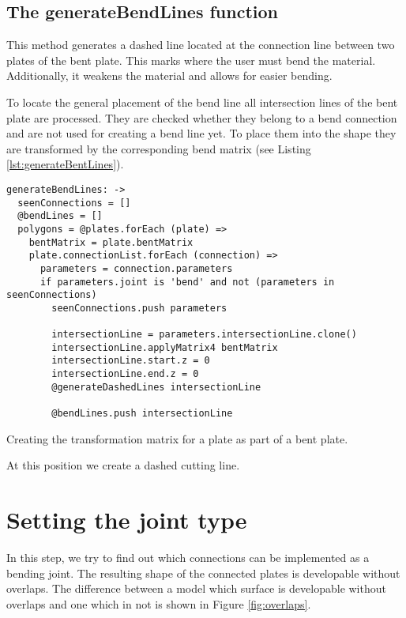 \documentclass[../ClassicThesis.tex]{subfiles}
\begin{document}
\subsection{The generateBendLines function}
\label{sec:generateBendLines}

This method generates a dashed line located at the connection line between two plates of the bent plate. This marks where the user must bend the material. Additionally, it weakens the material and allows for easier bending.

To locate the general placement of the bend line all intersection lines of the bent plate are processed. They are checked whether they belong to a bend connection and are not used for creating a bend line yet. To place them into the shape they are transformed by the corresponding bend matrix (see Listing \ref{lst:generateBentLines}).

\begin{listing}[ht]
\begin{verbatim}
generateBendLines: ->
  seenConnections = []
  @bendLines = []
  polygons = @plates.forEach (plate) =>
    bentMatrix = plate.bentMatrix
    plate.connectionList.forEach (connection) =>
      parameters = connection.parameters
      if parameters.joint is 'bend' and not (parameters in seenConnections)
        seenConnections.push parameters

        intersectionLine = parameters.intersectionLine.clone()
        intersectionLine.applyMatrix4 bentMatrix
        intersectionLine.start.z = 0
        intersectionLine.end.z = 0
        @generateDashedLines intersectionLine

        @bendLines.push intersectionLine
\end{verbatim}
\caption{Creating the transformation matrix for a plate as part of a bent plate.}
\label{lst:bend-matrix}
\end{listing}

At this position we create a dashed cutting line.

\section{Setting the joint type}

In this step, we try to find out which connections can be implemented as a bending joint. The resulting shape of the connected plates is developable without overlaps. The difference between a model which surface is developable without overlaps and one which in not is shown in Figure \ref{fig:overlaps}.
\end{document}
